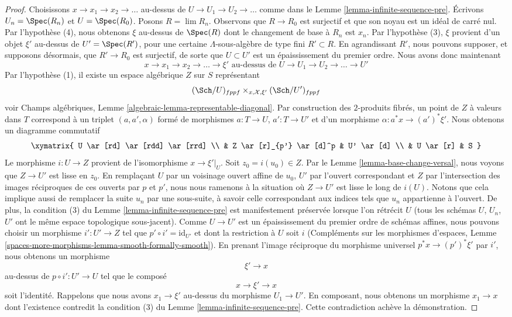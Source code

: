 \begin{proof}
\medskip\noindent
Choisissons $x \to x_1 \to x_2 \to \ldots$ au-dessus de
$U \to U_1 \to U_2 \to \ldots$ comme dans le Lemme \ref{lemma-infinite-sequence-pre}.
Écrivons $U_n = \Spec(R_n)$ et $U = \Spec(R_0)$.
Posons $R = \lim R_n$. Observons que $R \to R_0$ est surjectif
et que son noyau est un idéal de carré nul. Par l'hypothèse (4),
nous obtenons $\xi$ au-dessus de $\Spec(R)$ dont le changement de base à $R_n$ est $x_n$.
Par l'hypothèse (3), $\xi$ provient d'un objet $\xi'$ au-dessus de
$U' = \Spec(R')$, pour une certaine $\Lambda$-sous-algèbre de type fini
$R' \subset R$. En agrandissant $R'$, nous pouvons supposer, et supposons désormais, que
$R' \to R_0$ est surjectif, de sorte que $U \subset U'$ est un épaississement du premier ordre.
Nous avons donc maintenant
$$
x \to x_1 \to x_2 \to \ldots \to \xi'
\text{ au-dessus de }
U \to U_1 \to U_2 \to \ldots \to U'
$$
Par l'hypothèse (1), il existe un espace algébrique $Z$ sur $S$ représentant
$$
(\Sch/U)_{fppf} \times_{x, \mathcal{X}, \xi'} (\Sch/U')_{fppf}
$$
voir Champs algébriques, Lemme \ref{algebraic-lemma-representable-diagonal}.
Par construction des $2$-produits fibrés, un point de $Z$ à valeurs dans $T$
correspond à un triplet $(a, a', \alpha)$ formé de morphismes
$a : T \to U$, $a' : T \to U'$ et d'un morphisme $\alpha : a^*x \to (a')^*\xi'$.
Nous obtenons un diagramme commutatif
$$
\xymatrix{
U \ar[rd] \ar[rdd] \ar[rrd] \\
& Z \ar[r]_{p'} \ar[d]^p & U' \ar[d] \\
& U \ar[r] & S
}
$$
Le morphisme $i : U \to Z$ provient de l'isomorphisme $x \to \xi'|_U$.
Soit $z_0 = i(u_0) \in Z$. Par le Lemme \ref{lemma-base-change-versal},
nous voyons que $Z \to U'$ est lisse en $z_0$. En remplaçant $U$ par un
voisinage ouvert affine de $u_0$, $U'$ par l'ouvert correspondant
et $Z$ par l'intersection des images réciproques
de ces ouverts par $p$ et $p'$, nous nous ramenons à la situation où
$Z \to U'$ est lisse le long de $i(U)$. Notons que cela
implique aussi de remplacer la suite $u_n$ par une sous-suite, à savoir
celle correspondant aux indices tels que $u_n$ appartienne à l'ouvert. De plus, la condition
(3) du Lemme \ref{lemma-infinite-sequence-pre}
est manifestement préservée lorsque l'on rétrécit $U$
(tous les schémas $U$, $U_n$, $U'$ ont le même espace
topologique sous-jacent).
Comme $U \to U'$ est un épaississement du premier ordre de schémas affines,
nous pouvons choisir un morphisme $i' : U' \to Z$
tel que $p' \circ i' = \text{id}_{U'}$ et
dont la restriction à $U$ soit $i$
(Compléments sur les morphismes d'espaces, Lemme
\ref{spaces-more-morphisms-lemma-smooth-formally-smooth}).
En prenant l'image réciproque du morphisme universel
$p^*x \to (p')^*\xi'$ par $i'$, nous obtenons un morphisme
$$
\xi' \to x
$$
au-dessus de $p \circ i' : U' \to U$ tel que le composé
$$
x \to \xi' \to x
$$
soit l'identité. Rappelons que nous avons $x_1 \to \xi'$ au-dessus du
morphisme $U_1 \to U'$. En composant, nous obtenons un morphisme
$x_1 \to x$ dont l'existence contredit la condition
(3) du Lemme \ref{lemma-infinite-sequence-pre}.
Cette contradiction achève la démonstration.
\end{proof}

